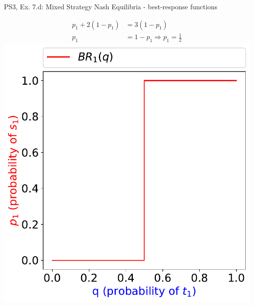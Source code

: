 \begin{frame}{PS3, Ex. 7.d: Mixed Strategy Nash Equilibria - best-response functions}
\begin{multicols}{2}
    \begin{align*}
      p_1 + 2(1-p_1)  &= 3(1-p_1) \\
      p_1             &= 1-p_1 \Rightarrow p_1 = \frac{1}{2}
    \end{align*}
  \vfill\null \columnbreak
    \includegraphics[width=\columnwidth]{figures/5d1}
  \vfill\null
  \end{multicols}
\end{frame}
